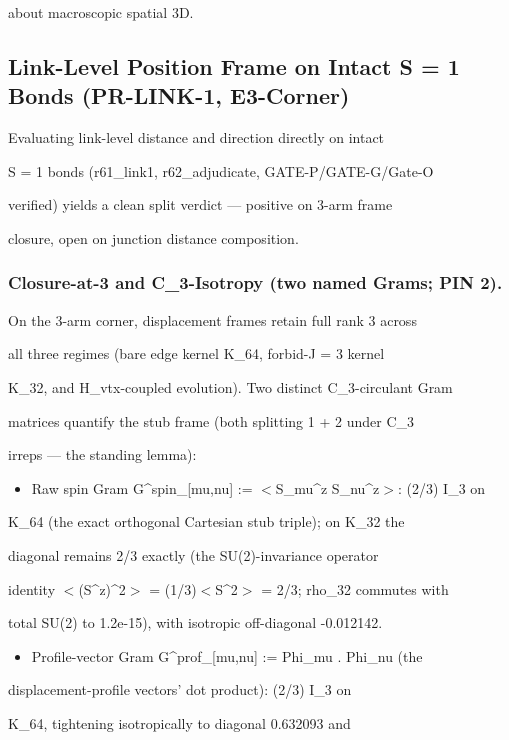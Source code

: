 \documentclass[11pt,a4paper]{article}
\theoremstyle{definition}
\begin{document}
about macroscopic spatial 3D.


\subsection{Link-Level Position Frame on Intact S = 1 Bonds (PR-LINK-1, E3-Corner)}

Evaluating link-level distance and direction directly on intact

S = 1 bonds (r61\_link1, r62\_adjudicate, GATE-P/GATE-G/Gate-O

verified) yields a clean split verdict — positive on 3-arm frame

closure, open on junction distance composition.


\subsubsection{Closure-at-3 and C\_3-Isotropy (two named Grams; PIN 2).}
On the 3-arm corner, displacement frames retain full rank 3 across

all three regimes (bare edge kernel K\_64, forbid-J = 3 kernel

K\_32, and H\_vtx-coupled evolution). Two distinct C\_3-circulant Gram

matrices quantify the stub frame (both splitting 1 + 2 under C\_3

irreps — the standing lemma):


\begin{itemize}[leftmargin=1.4em]
\item Raw spin Gram G\^{}spin\_[mu,nu] := $<$S\_mu\^{}z S\_nu\^{}z$>$: (2/3) I\_3 on
\end{itemize}
    K\_64 (the exact orthogonal Cartesian stub triple); on K\_32 the

    diagonal remains 2/3 exactly (the SU(2)-invariance operator

    identity $<$(S\^{}z)\^{}2$>$ = (1/3)$<$S\^{}2$>$ = 2/3; rho\_32 commutes with

    total SU(2) to 1.2e-15), with isotropic off-diagonal -0.012142.

\begin{itemize}[leftmargin=1.4em]
\item Profile-vector Gram G\^{}prof\_[mu,nu] := Phi\_mu . Phi\_nu (the
\end{itemize}
    displacement-profile vectors' dot product): (2/3) I\_3 on

    K\_64, tightening isotropically to diagonal 0.632093 and
\end{document}
